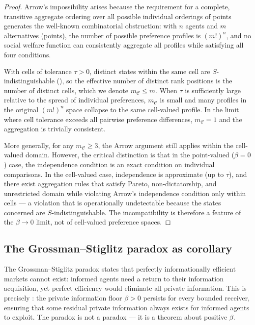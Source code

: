 \documentclass[twocolumn,11pt,a4paper]{article}
\newcommand{\Cell}{\mathcal{C}}
\begin{document}
\begin{proof}
Arrow's impossibility arises because the requirement for a complete,
transitive aggregate ordering over all possible individual orderings of
points generates the well-known combinatorial obstruction: with $n$
agents and $m$ alternatives (points), the number of possible preference
profiles is $(m!)^n$, and no social welfare function can consistently
aggregate all profiles while satisfying all four conditions.

With cells of tolerance $\tau>0$, distinct states within the same cell
are $S$-indistinguishable (), so the effective number
of distinct rank positions is the number of distinct cells, which we
denote $m_\Cell\leq m$.  When $\tau$ is sufficiently large relative to
the spread of individual preferences, $m_\Cell$ is small and many
profiles in the original $(m!)^n$ space collapse to the same cell-valued
profile.  In the limit where cell tolerance exceeds all pairwise preference
differences, $m_\Cell=1$ and the aggregation is trivially consistent.

More generally, for any $m_\Cell\geq 3$, the Arrow argument still applies
within the cell-valued domain.  However, the critical distinction is that
in the point-valued ($\beta=0$) case, the independence condition is an
exact condition on individual comparisons.  In the cell-valued case,
independence is approximate (up to $\tau$), and there exist aggregation
rules that satisfy Pareto, non-dictatorship, and unrestricted domain while
violating Arrow's independence condition only within cells — a violation
that is operationally undetectable because the states concerned are
$S$-indistinguishable.  The incompatibility is therefore a feature of the
$\beta\to 0$ limit, not of cell-valued preference spaces.
\end{proof}

\subsection{The Grossman--Stiglitz paradox as corollary}
\label{sec:grossmanstiglitz}

The Grossman--Stiglitz paradox \cite{grossmanstiglitz1980} states that
perfectly informationally efficient markets cannot exist: informed agents
need a return to their information acquisition, yet perfect efficiency
would eliminate all private information.  This is precisely
: the private information floor $\beta>0$ persists
for every bounded receiver, ensuring that some residual private
information always exists for informed agents to exploit.  The paradox
is not a paradox — it is a theorem about positive $\beta$.
\end{document}
